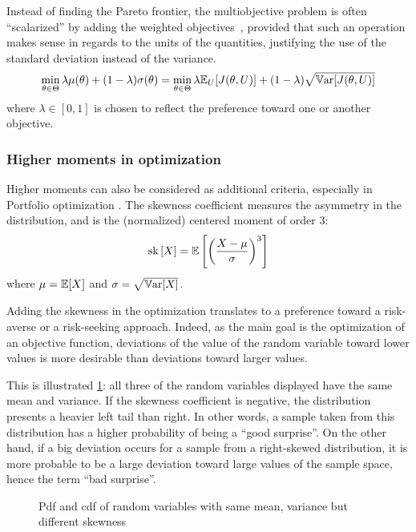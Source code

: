 \documentclass[../../Main_ManuscritThese.tex]{subfiles}
\newcommand\imgpath{/home/victor/acadwriting/Manuscrit/Text/Chapter3/img/}
\begin{document}
Instead of finding the Pareto frontier, the multiobjective problem is
often ``scalarized'' by adding the weighted
objectives~\cite{marler_weighted_2010}, provided that such an
operation makes sense in regards to the units of the quantities,
justifying the use of the standard deviation instead of the variance.
\begin{equation}
  \min_{\theta\in\Theta} \lambda \mu(\theta) + (1- \lambda)\sigma(\theta) =   \min_{\theta\in\Theta} \lambda \mathbb{E}_{U}[J(\theta,U)] + (1- \lambda)\sqrt{\mathbb{V}\mathrm{ar}[J(\theta,U)]}
\end{equation}
where $\lambda \in [0,1]$ is chosen to reflect the preference toward one or another objective.

\subsubsection{Higher moments in optimization}
\label{sec:higher_moments}
Higher moments can also be considered as additional criteria,
especially in Portfolio optimization
\cite{lai_mean-variance-skewness-kurtosis-based_2006,briec_mean-variance-skewness_2007}.
The skewness coefficient measures the asymmetry in the distribution,
and is the (normalized) centered moment of order $3$:
\begin{equation}
  \mathrm{sk}\left[X\right] = \mathbb{E}\left[\left(\frac{X - \mu}{\sigma}\right)^3\right]
\end{equation}
where $\mu = \mathbb{E}[X]$ and $\sigma = \sqrt{\mathbb{V}\mathrm{ar}[X]}$.

Adding the skewness in the optimization translates to a preference
toward a risk-averse or a risk-seeking approach. Indeed, as the main
goal is the optimization of an objective function, deviations of the
value of the random variable toward lower values is more desirable
than deviations toward larger values.

This is illustrated \cref{fig:skewness_example}: all three of the
random variables displayed have the same mean and variance.  If the
skewness coefficient is negative, the distribution presents a heavier
left tail than right. In other words, a sample taken from this
distribution has a higher probability of being a ``good surprise''. On
the other hand, if a big deviation occurs for a sample from a
right-skewed distribution, it is more probable to be a large deviation
toward large values of the sample space, hence the term ``bad
surprise''.

\begin{figure}[ht]
  \centering
  
  \caption[Influence of the skewness]{\label{fig:skewness_example} Pdf and cdf of random variables with same mean, variance but different skewness}
\end{figure}
\end{document}
